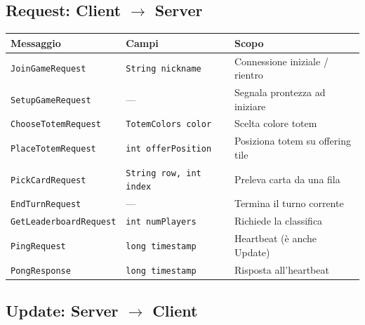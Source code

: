 \documentclass[a4paper,12pt]{article}
\newcommand{\code}[1]{\texttt{#1}}
\begin{document}
\subsection{Request: Client $\to$ Server}

\begin{small}
\begin{tabularx}{\textwidth}{@{}lp{4.2cm}X@{}}
\toprule
\textbf{Messaggio} & \textbf{Campi} & \textbf{Scopo} \\
\midrule
\code{JoinGameRequest}       & \code{String nickname}                & Connessione iniziale / rientro \\
\code{SetupGameRequest}      & ---                                   & Segnala prontezza ad iniziare \\
\code{ChooseTotemRequest}    & \code{TotemColors color}              & Scelta colore totem \\
\code{PlaceTotemRequest}     & \code{int offerPosition}              & Posiziona totem su offering tile \\
\code{PickCardRequest}       & \code{String row, int index}          & Preleva carta da una fila \\
\code{EndTurnRequest}        & ---                                   & Termina il turno corrente \\
\code{GetLeaderboardRequest} & \code{int numPlayers}                 & Richiede la classifica \\
\code{PingRequest}           & \code{long timestamp}                 & Heartbeat (è anche Update) \\
\code{PongResponse}          & \code{long timestamp}                 & Risposta all'heartbeat \\
\bottomrule
\end{tabularx}
\end{small}

\subsection{Update: Server $\to$ Client}
\end{document}
